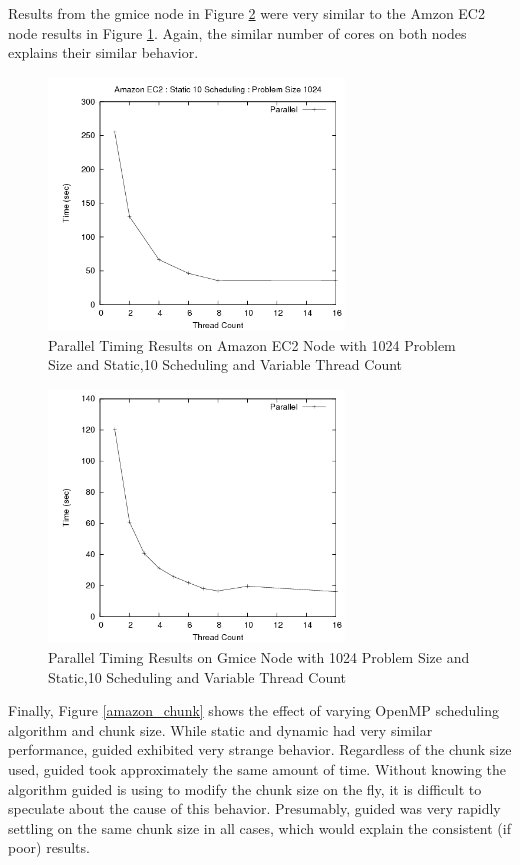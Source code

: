 \documentclass{article}
\begin{document}
Results from the gmice node in Figure \ref{gmice_threads} were very similar to the Amzon EC2 node results in Figure \ref{amazon_threads}. Again, the similar number of cores on both nodes explains their similar behavior.

\begin{figure}
\centering
\includegraphics[width=0.7\textwidth]{../data/amazon_threads.png}
\caption{Parallel Timing Results on Amazon EC2 Node with 1024 Problem Size and Static,10 Scheduling and Variable Thread Count}
\label{amazon_threads}
\end{figure}

\begin{figure}
\centering
\includegraphics[width=0.7\textwidth]{../data/gmice_threads.png}
\caption{Parallel Timing Results on Gmice Node with 1024 Problem Size and Static,10 Scheduling and Variable Thread Count}
\label{gmice_threads}
\end{figure}

Finally, Figure \ref{amazon_chunk} shows the effect of varying OpenMP scheduling algorithm and chunk size. While static and dynamic had very similar performance, guided exhibited very strange behavior. Regardless of the chunk size used, guided took approximately the same amount of time. Without knowing the algorithm guided is using to modify the chunk size on the fly, it is difficult to speculate about the cause of this behavior. Presumably, guided was very rapidly settling on the same chunk size in all cases, which would explain the consistent (if poor) results.
\end{document}
